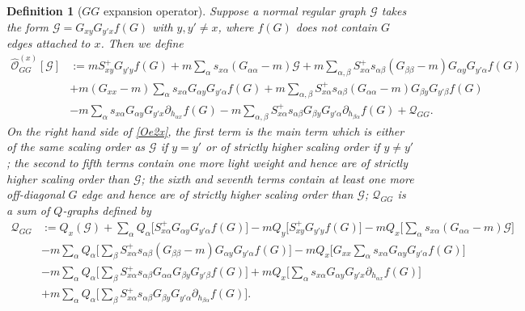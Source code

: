 \documentclass{article}
\newcommand{\1}{\mathds{1}}
\numberwithin{equation}{section}
\newcommand{\al}{\alpha}
\renewcommand{\cal}{\mathcal}
\newcommand{\wh}{\widehat}
\theoremstyle{plain} %
\newtheorem{definition}[theorem]{Definition}
\theoremstyle{remark}
\begin{document}
   \begin{definition}[$G G$ expansion operator] \label{GG-def}
	Suppose a normal regular graph $\cal G$ takes the form $\cal G=G_{xy}   G_{y' x } f(G)$ with $y,y' \ne x$, where $f (G) $ does not contain $G$ edges attached to $x$. %
	Then we define
	\begin{align}
		\wh{\cal O}_{GG}^{(x)} [\cal G] & := %
		m S^{+}_{xy} G_{y' y} f(G)  + m \sum_\al  s_{x\al} (G_{\al \al}-m) \cal G + m \sum_{\al,\beta}  S^{+}_{x\al}  s_{\al\beta} (G_{\beta \beta}-m) G_{\al y}   G_{y'\al} f(G) \nonumber \\
		&  + m(G_{xx }-m)   \sum_\al s_{x\al}G_{\al y}   G_{y'\al} f(G) + m \sum_{\al,\beta}  S^+_{x\al} s_{\al\beta}  (G_{\al\al }-m) G_{\beta y}   G_{y'\beta} f(G)  \nonumber\\
		& - m \sum_{ \al}  s_{x\al}G_{\al y} G_{y' x} \partial_{ h_{\al x}}f(G) - m \sum_{\al,\beta} S^{+}_{x\al} s_{\al\beta}G_{\beta y} G_{y' \al} \partial_{ h_{\beta \al}}f(G) + \cal Q_{GG} .\label{Oe2x}
	\end{align}
	On the right hand side of \eqref{Oe2x}, the first term is the main term which is either of the same scaling order as $\cal G$ if $y=y'$ or of strictly higher scaling order if $y\ne y'$; the second to fifth terms contain one more light weight and hence are of strictly higher scaling order than $\cal G$; the sixth and seventh terms contain at least one more off-diagonal $G$ edge and hence are of strictly higher scaling order than $\cal G$; $\cal Q_{GG} $ is a sum of $Q$-graphs defined by
	\begin{align}
		\cal Q_{GG}&:=  Q_x \left(\cal G\right)+  \sum_\al Q_\al\Big[ S^+_{x\al}  G_{\al y}   G_{y'\al} f(G) \Big]  - m Q_y\Big[S^{+}_{xy}  G_{y' y} f(G)\Big] - m Q_x\Big[\sum_\al  s_{x\al} (G_{\al\al}-m) \cal G\Big]  \nonumber\\
		&- m \sum_\al Q_\al\Big[\sum_{ \beta}  S^{+}_{x\al}  s_{\al\beta} (G_{\beta \beta}-m)G_{\al y}   G_{y'\al} f(G)\Big] - mQ_x\Big[ G_{xx }  \sum_\al s_{x\al} G_{\al y}   G_{y'\al} f(G)\Big] \nonumber\\
		&- m\sum_\al Q_\al\Big[ \sum_{ \beta}  S^{+}_{x\al}  s_{\al\beta} G_{\al\al }  G_{\beta y}   G_{y'\beta} f(G)\Big]  + m Q_x\Big[\sum_{ \al}  s_{x\al} G_{\al y} G_{y' x} \partial_{ h_{ \al x}}f(G)\Big] \\
		& + m\sum_\al Q_\al\Big[ \sum_{\beta} S^{+}_{x\al} s_{\al\beta}G_{\beta y} G_{y' \al} \partial_{h_{\beta \al}}f (G)\Big] .\nonumber 

\end{align}
\end{definition}
\end{document}
